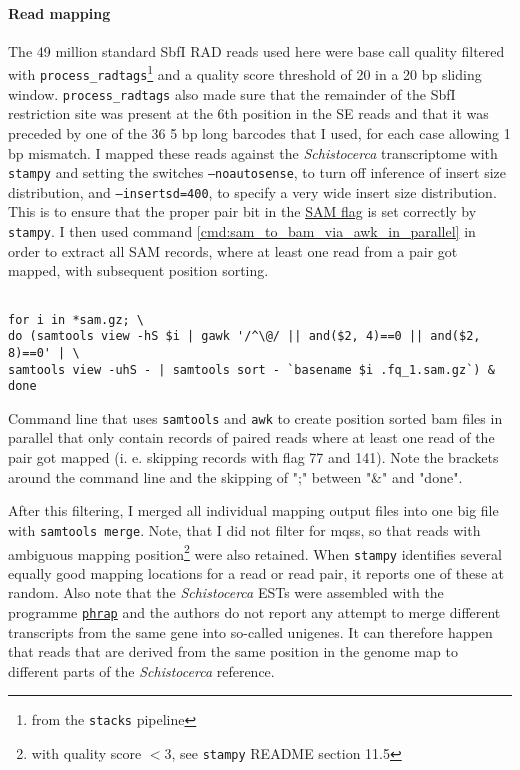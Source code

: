 \documentclass[a4paper,12pt,times,authoryear,twoside,print,index]{Classes/PhDThesisPSnPDF}\usepackage[]{graphicx}\usepackage[]{color}
\begin{document}
\paragraph{Read mapping}
The 49 million standard SbfI RAD reads used here were base call quality filtered with \texttt{process\_radtags}\footnote{from the \texttt{stacks} pipeline} and a quality score threshold of 20 in a 20 bp sliding window. \texttt{process\_radtags} also made sure that the remainder of the SbfI restriction site was present at the 6th position in the SE reads and that it was preceded by one of the 36 5 bp long \glspl{barcode} that I used, for each case allowing 1 bp mismatch. I mapped these reads against the \textit{Schistocerca} transcriptome \citep{Badisco2011} with \texttt{stampy} \citep{Lunter2011} and setting the switches \texttt{--noautosense}, to turn off inference of insert size distribution, and \texttt{--insertsd=400}, to specify a very wide insert size distribution. This is to ensure that the \gls{proper pair}  bit in the \href{http://samtools.github.io/hts-specs/SAMv1.pdf}{SAM flag} is set correctly by \texttt{stampy}. I then used command \ref{cmd:sam_to_bam_via_awk_in_parallel} in order to extract all \gls{SAM} records, where at least one read from a pair got mapped, with subsequent position sorting.
%
\begin{cmd}
\captionsetup{type=cmd} %
\begin{Verbatim}[fontsize=\scriptsize, formatcom=\color{darkgray}]

for i in *sam.gz; \
do (samtools view -hS $i | gawk '/^\@/ || and($2, 4)==0 || and($2, 8)==0' | \
samtools view -uhS - | samtools sort - `basename $i .fq_1.sam.gz`) & done
\end{Verbatim}
\caption{\small Command line that uses \texttt{samtools} and \texttt{awk} to create position sorted bam files in parallel that only contain records of paired reads where at least one read of the pair got mapped (i. e. skipping records with flag 77 and 141). \scriptsize{Note the brackets around the command line and the skipping of ";" between "\&" and "done"}. }
\label{cmd:sam_to_bam_via_awk_in_parallel}
\end{cmd}
%
After this filtering, I merged all individual mapping output files into one big file with \texttt{samtools merge}.
Note, that I did not filter for \glspl{mqs}, so that reads with ambiguous mapping position\footnote{with quality score $<3$, see \texttt{stampy} README section 11.5} were also retained. When \texttt{stampy} identifies several equally good mapping locations for a read or read pair, it reports one of these at random. Also note that the \textit{Schistocerca} \glspl{EST} were assembled with the programme \href{http://www.phrap.org/phredphrap/general.html}{\texttt{phrap}} and the authors do not report any attempt to merge different transcripts from the same gene into so-called unigenes. It can therefore happen that reads that are derived from the same position in the genome map to different parts of the \textit{Schistocerca} reference.
\end{document}
